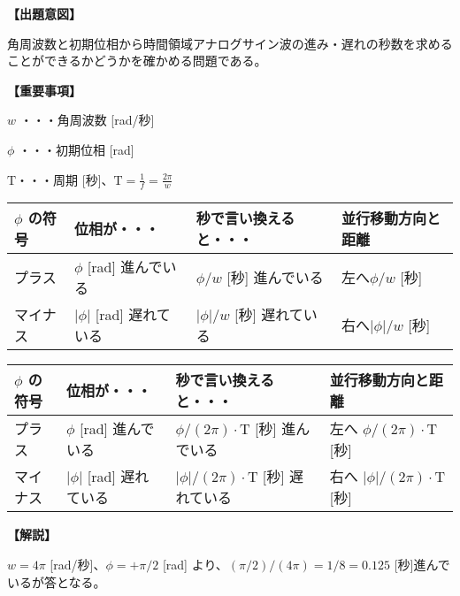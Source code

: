 \noindent \textbf{【出題意図】}

\noindent 角周波数と初期位相から時間領域アナログサイン波の進み・遅れの秒数を求めることができるかどうかを確かめる問題である。

\vspace{1em}
\noindent \textbf{【重要事項】}

\bigskip
\noindent $w$ ・・・角周波数 [rad/秒]

\bigskip
\noindent $\phi$ ・・・初期位相 [rad]

\bigskip
$\textrm{T}$・・・周期 [秒]、$\textrm{T} = \frac{1}{f} = \frac{2\pi}{w}$

\begin{center}
\begin{tabularx}{0.9\fbwidth}{|X|X|X|X|}
\hline
$\phi$ の符号&  位相が・・・   & 秒で言い換えると・・・   & 並行移動方向と距離 \\
\hline
プラス &  $\phi$ [rad] 進んでいる & $\phi/w$ [秒] 進んでいる & 左へ$\phi/w$ [秒] \\
\hline
マイナス &  $|\phi|$ [rad] 遅れている & $|\phi|/w$ [秒] 遅れている & 右へ$|\phi|/w$ [秒] \\
\hline
\end{tabularx}

\medskip
\begin{tabularx}{0.9\fbwidth}{|X|X|X|X|}
\hline
$\phi$ の符号&  位相が・・・   & 秒で言い換えると・・・   & 並行移動方向と距離 \\
\hline
プラス &  $\phi$ [rad] 進んでいる & $\phi/(2\pi) \cdot \textrm{T}$ [秒] 進んでいる & 左へ $\phi/(2\pi) \cdot \textrm{T}$ [秒] \\
\hline
マイナス &  $|\phi|$ [rad] 遅れている & $|\phi|/(2\pi) \cdot \textrm{T}$ [秒] 遅れている & 右へ $|\phi|/(2\pi) \cdot \textrm{T}$ [秒] \\
\hline
\end{tabularx}
\end{center}

\vspace{1em}
\noindent \textbf{【解説】}

\noindent $w = 4\pi$ [rad/秒]、$\phi = +\pi/2$ [rad] より、$(\pi/2)/(4\pi) = 1/8 = 0.125$ [秒]進んでいるが答となる。

